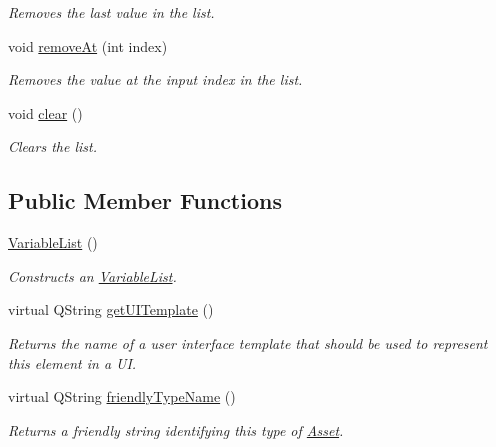 \begin{DoxyCompactItemize}
\begin{DoxyCompactList}\small\item\em Removes the last value in the list. \end{DoxyCompactList}\item 
\hypertarget{class_picto_1_1_variable_list_ab22a9f0a81178bdfc5f9ea2f181df34b}{void \hyperlink{class_picto_1_1_variable_list_ab22a9f0a81178bdfc5f9ea2f181df34b}{remove\-At} (int index)}\label{class_picto_1_1_variable_list_ab22a9f0a81178bdfc5f9ea2f181df34b}

\begin{DoxyCompactList}\small\item\em Removes the value at the input index in the list. \end{DoxyCompactList}\item 
\hypertarget{class_picto_1_1_variable_list_a9187193282221624ee8cd949c22d324f}{void \hyperlink{class_picto_1_1_variable_list_a9187193282221624ee8cd949c22d324f}{clear} ()}\label{class_picto_1_1_variable_list_a9187193282221624ee8cd949c22d324f}

\begin{DoxyCompactList}\small\item\em Clears the list. \end{DoxyCompactList}\end{DoxyCompactItemize}
\subsection*{Public Member Functions}
\begin{DoxyCompactItemize}
\item 
\hyperlink{class_picto_1_1_variable_list_a25ca4487aba266f5bb2b6c0dd4d4e669}{Variable\-List} ()
\begin{DoxyCompactList}\small\item\em Constructs an \hyperlink{class_picto_1_1_variable_list}{Variable\-List}. \end{DoxyCompactList}\item 
\hypertarget{class_picto_1_1_variable_list_a5c96018fc14bc6f72877fc8a11360cff}{virtual Q\-String \hyperlink{class_picto_1_1_variable_list_a5c96018fc14bc6f72877fc8a11360cff}{get\-U\-I\-Template} ()}\label{class_picto_1_1_variable_list_a5c96018fc14bc6f72877fc8a11360cff}

\begin{DoxyCompactList}\small\item\em Returns the name of a user interface template that should be used to represent this element in a U\-I. \end{DoxyCompactList}\item 
virtual Q\-String \hyperlink{class_picto_1_1_variable_list_a49263e98e91504462b3cf717666da998}{friendly\-Type\-Name} ()
\begin{DoxyCompactList}\small\item\em Returns a friendly string identifying this type of \hyperlink{class_picto_1_1_asset}{Asset}. \end{DoxyCompactList}\end{DoxyCompactItemize}
